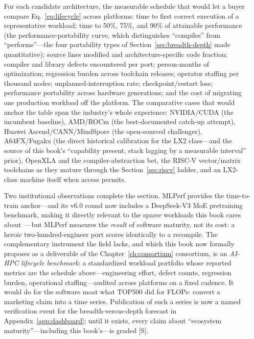 For each candidate architecture, the measurable schedule that would let a buyer compare Eq.~\eqref{eq:lifecycle} across platforms: time to first correct execution of a representative workload; time to 50\%, 75\%, and 90\% of attainable performance (the performance-portability curve, which distinguishes ``compiles'' from ``performs''---the four portability types of Section~\ref{sec:breadth-depth} made quantitative); source lines modified and architecture-specific code fraction; compiler and library defects encountered per port; person-months of optimization; regression burden across toolchain releases; operator staffing per thousand nodes; unplanned-interruption rate; checkpoint/restart loss; performance portability across hardware generations; and the cost of migrating one production workload off the platform. The comparative cases that would anchor the table span the industry's whole experience: NVIDIA/CUDA (the incumbent baseline), AMD/ROCm (the best-documented catch-up attempt), Huawei Ascend/CANN/MindSpore (the open-sourced challenger), A64FX/Fugaku (the direct historical calibration for the LX2 class---and the source of this book's ``capability present, stack lagging by a measurable interval'' prior), OpenXLA and the compiler-abstraction bet, the RISC-V vector/matrix toolchains as they mature through the Section~\ref{sec:riscv} ladder, and an LX2-class machine itself when access permits.

Two institutional observations complete the section. MLPerf provides the time-to-train anchor---and its v6.0 round now includes a DeepSeek-V3 MoE pretraining benchmark, making it directly relevant to the sparse workloads this book cares about~\cite{mlperf-v6}---but MLPerf measures the \emph{result} of software maturity, not its cost: a heroic two-hundred-engineer port scores identically to a recompile. The complementary instrument the field lacks, and which this book now formally proposes as a deliverable of the Chapter~\ref{ch:consortium} consortium, is an \emph{AI-HPC lifecycle benchmark}: a standardized workload portfolio whose reported metrics are the schedule above---engineering effort, defect counts, regression burden, operational staffing---audited across platforms on a fixed cadence. It would do for the software moat what TOP500 did for FLOPs: convert a marketing claim into a time series. Publication of such a series is now a named verification event for the breadth-versus-depth forecast in Appendix~\ref{app:dashboard}; until it exists, every claim about ``ecosystem maturity''---including this book's---is graded [S].

